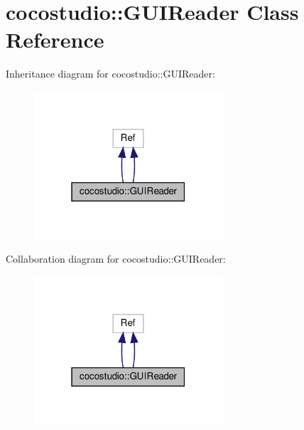 \hypertarget{classcocostudio_1_1GUIReader}{}\section{cocostudio\+:\+:G\+U\+I\+Reader Class Reference}
\label{classcocostudio_1_1GUIReader}


Inheritance diagram for cocostudio\+:\+:G\+U\+I\+Reader\+:
\nopagebreak
\begin{figure}[H]
\begin{center}
\leavevmode
\includegraphics[width=199pt]{classcocostudio_1_1GUIReader__inherit__graph}
\end{center}
\end{figure}


Collaboration diagram for cocostudio\+:\+:G\+U\+I\+Reader\+:
\nopagebreak
\begin{figure}[H]
\begin{center}
\leavevmode
\includegraphics[width=199pt]{classcocostudio_1_1GUIReader__coll__graph}
\end{center}
\end{figure}
